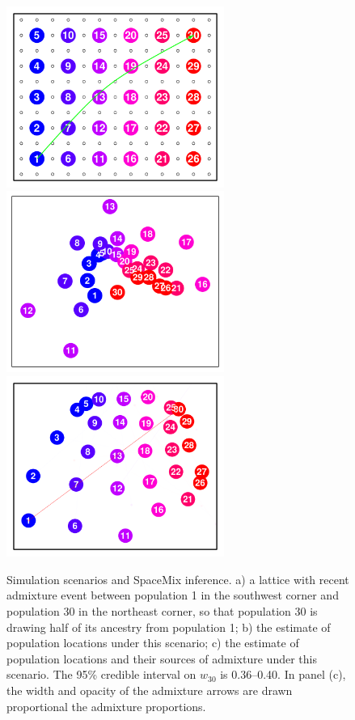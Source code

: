 \documentclass[10pt,letterpaper]{article}
\begin{document}
\begin{figure}
	\centering
			{\includegraphics[width=2.8in,height=2.33in]{../figs/sims/corner_admixture_lattice.pdf}}
			{\includegraphics[width=2.8in,height=2.33in]{../figs/sims/GeoGenMap_corner_admixture_CYOL.pdf}}
			{\includegraphics[width=2.8in,height=2.33in]{../figs/sims/GeoGenMap_corner_admixture.pdf}}
	\caption{Simulation scenarios and SpaceMix inference.  a) a lattice with recent admixture event between population 1 in the southwest corner and population 30 in the northeast corner, so that population 30 is drawing half of its ancestry from population 1; b) the estimate of population locations under this scenario; c) the estimate of population locations and their sources of admixture under this scenario.  The 95\% credible interval on $w_{30}$ is 0.36--0.40. In panel (c), the width and opacity of the admixture arrows are drawn proportional the admixture proportions.}\label{sfig:corner_admix_scenarios}
\end{figure}
\end{document}
